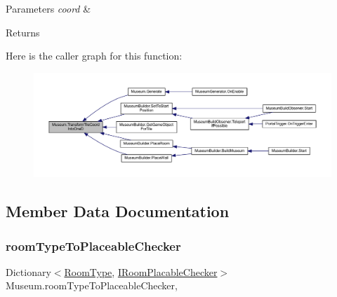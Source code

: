 \begin{DoxyParams}{Parameters}
{\em coord} & \\
\hline
\end{DoxyParams}
\begin{DoxyReturn}{Returns}

\end{DoxyReturn}
Here is the caller graph for this function\+:
\nopagebreak
\begin{figure}[H]
\begin{center}
\leavevmode
\includegraphics[width=350pt]{class_museum_a405e60db962417dde46d46180cbf81df_icgraph}
\end{center}
\end{figure}


\subsection{Member Data Documentation}
\mbox{\label{class_museum_af3826f71fcb80bd1bf30f5fbf75b5e28}} 
\subsubsection{\texorpdfstring{room\+Type\+To\+Placeable\+Checker}{roomTypeToPlaceableChecker}}
{\footnotesize\ttfamily Dictionary$<$\mbox{\hyperlink{_room_8cs_ab540f7414f306325d92272bcef1e34e1}{Room\+Type}}, \mbox{\hyperlink{interface_i_room_placable_checker}{I\+Room\+Placable\+Checker}}$>$ Museum.\+room\+Type\+To\+Placeable\+Checker\hspace{0.3cm}{\ttfamily [static]}, {\ttfamily [private]}}


